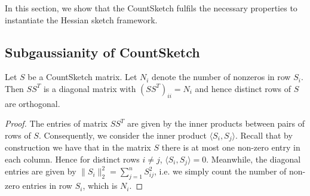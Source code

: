 In this section, we show that the CountSketch fulfils the necessary
properties to instantiate the Hessian sketch framework.

\subsection{Subgaussianity of CountSketch}



%

\begin{Lemma} \label{lem:orthogonal_rows}
  Let $S$ be a CountSketch matrix.
  Let $N_i$ denote the number of nonzeros in row $S_i$.
  Then $SS^T$ is a diagonal matrix with $(SS^T)_{ii} = N_i$ and hence
  distinct rows of $S$ are orthogonal.
\end{Lemma}

\begin{proof}
The entries of matrix $SS^T$ are given by the inner products between
pairs of rows of $S$.
Consequently, we consider the inner product $\langle S_i, S_j \rangle$.
Recall that by construction we have that in the matrix $S$
there is at most one non-zero entry in each column. 
Hence for distinct rows $i\neq j$, $\langle S_i, S_j \rangle = 0$. 
Meanwhile, the diagonal entries are given by 
$\| S_i \|_2^2 = \sum_{j=1}^n S_{ij}^2$, i.e. we simply count the
number of non-zero entries in row $S_i$, which is $N_i$. 
\end{proof}

